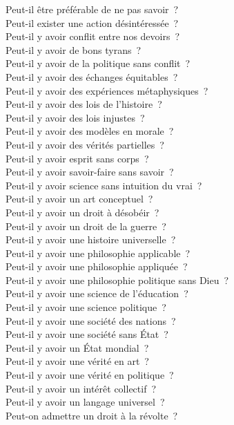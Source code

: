 \documentclass[a4paper,12pt]{article}
\begin{document}
Peut-il être préférable de ne pas savoir ? \\
Peut-il exister une action désintéressée ? \\
Peut-il y avoir conflit entre nos devoirs ? \\
Peut-il y avoir de bons tyrans ? \\
Peut-il y avoir de la politique sans conflit ? \\
Peut-il y avoir des échanges équitables ? \\
Peut-il y avoir des expériences métaphysiques ? \\
Peut-il y avoir des lois de l'histoire ? \\
Peut-il y avoir des lois injustes ? \\
Peut-il y avoir des modèles en morale ? \\
Peut-il y avoir des vérités partielles ? \\
Peut-il y avoir esprit sans corps ? \\
Peut-il y avoir savoir-faire sans savoir ? \\
Peut-il y avoir science sans intuition du vrai ? \\
Peut-il y avoir un art conceptuel ? \\
Peut-il y avoir un droit à désobéir ? \\
Peut-il y avoir un droit de la guerre ? \\
Peut-il y avoir une histoire universelle ? \\
Peut-il y avoir une philosophie applicable ? \\
Peut-il y avoir une philosophie appliquée ? \\
Peut-il y avoir une philosophie politique sans Dieu ? \\
Peut-il y avoir une science de l'éducation ? \\
Peut-il y avoir une science politique ? \\
Peut-il y avoir une société des nations ? \\
Peut-il y avoir une société sans État ? \\
Peut-il y avoir un État mondial ? \\
Peut-il y avoir une vérité en art ? \\
Peut-il y avoir une vérité en politique ? \\
Peut-il y avoir un intérêt collectif ? \\
Peut-il y avoir un langage universel ? \\
Peut-on admettre un droit à la révolte ? \\
\end{document}
